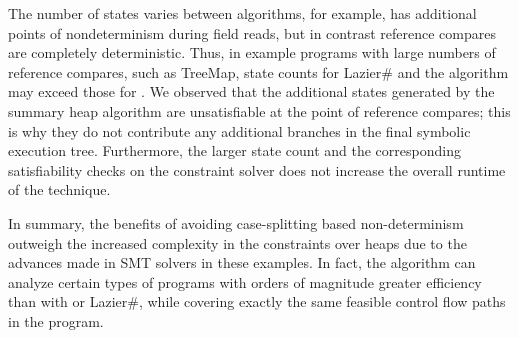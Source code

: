 The number of states varies between algorithms, for example, \gsetxt{}
has additional points of nondeterminism during field reads, but in
contrast reference compares are completely deterministic. Thus, in
example programs with large numbers of reference compares, such as
TreeMap, state counts for Lazier\# and the \symtxt{} algorithm may
exceed those for \gsetxt{}. We observed that the additional states
generated by the summary heap algorithm are unsatisfiable at the point
of reference compares; this is why they do not contribute any
additional branches in the final symbolic execution tree. Furthermore,
the larger state count and the corresponding satisfiability checks on
the constraint solver does not increase the overall runtime of the
technique.

In summary, the benefits of avoiding case-splitting based
non-determinism outweigh the increased complexity in the constraints
over heaps due to the advances made in SMT solvers in these
examples. In fact, the \symtxt{} algorithm can analyze certain types
of programs with orders of magnitude greater efficiency than with
\gsetxt{} or Lazier\#, while covering exactly the same feasible
control flow paths in the program.



